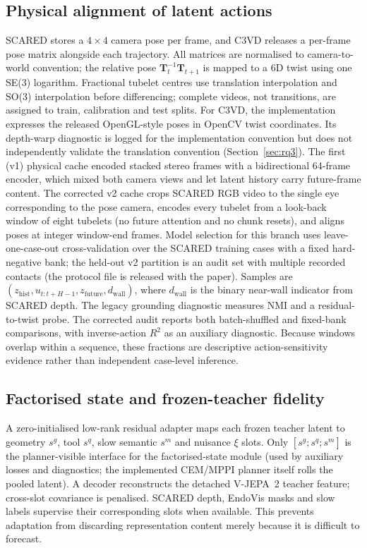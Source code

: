 \documentclass[preprint,12pt]{elsarticle}
\begin{document}
\subsection{Physical alignment of latent actions}
SCARED stores a $4{\times}4$ camera pose per frame, and C3VD releases a
per-frame pose matrix alongside each trajectory.
All matrices are normalised to camera-to-world convention; the relative pose
$\mathbf{T}_t^{-1}\mathbf{T}_{t+1}$ is mapped to a $6$D twist using one
SE(3) logarithm. Fractional tubelet centres use translation interpolation and
SO(3) interpolation before differencing; complete videos, not
transitions, are assigned to train, calibration and test splits.
For C3VD, the implementation expresses the released OpenGL-style poses in
OpenCV twist coordinates. Its depth-warp diagnostic is logged for the
implementation convention but does not independently validate the translation
convention (Section~\ref{sec:rq3}).
The first (v1) physical cache encoded stacked stereo frames with a
bidirectional 64-frame encoder, which mixed both camera views and let latent
history carry future-frame content. The corrected v2 cache crops SCARED
RGB video to the single eye corresponding to the pose camera, encodes every
tubelet from a look-back window of eight tubelets (no future attention and no
chunk resets), and aligns poses at integer window-end frames. Model selection
for this branch uses leave-one-case-out cross-validation over the SCARED
training cases with a fixed hard-negative bank; the held-out v2 partition is
an audit set with multiple recorded contacts (the protocol file is released
with the paper). Samples are
$(z_{\mathrm{hist}},u_{t:t+H-1},z_{\mathrm{future}},d_{\mathrm{wall}})$,
where $d_{\mathrm{wall}}$ is the binary near-wall indicator from SCARED depth.
The legacy grounding diagnostic measures NMI and a residual-to-twist probe.
The corrected audit reports both batch-shuffled and fixed-bank comparisons,
with inverse-action $R^2$ as an auxiliary diagnostic. Because windows overlap
within a sequence, these fractions are descriptive action-sensitivity
evidence rather than independent case-level inference.

\subsection{Factorised state and frozen-teacher fidelity}
A zero-initialised low-rank residual adapter maps each frozen teacher latent to
geometry $s^g$, tool $s^q$, slow semantic $s^m$ and nuisance $\xi$ slots. Only
$[s^g;s^q;s^m]$ is the planner-visible interface for the factorised-state
module (used by auxiliary losses and diagnostics; the implemented CEM/MPPI
planner itself rolls the pooled latent). A decoder reconstructs the detached
V-JEPA~2 teacher feature; cross-slot covariance is penalised. SCARED depth,
EndoVis masks and slow labels supervise their corresponding slots when
available. This prevents adaptation from discarding representation content
merely because it is difficult to forecast.
\end{document}
